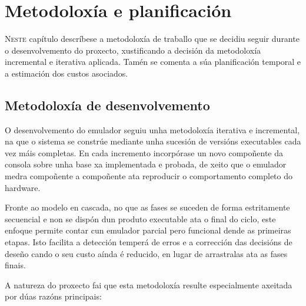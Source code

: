 \chapter{Metodoloxía e planificación}
\label{chap:metodoloxia}

\lettrine{N}{este} capítulo descríbese a metodoloxía de traballo que se decidiu seguir durante o desenvolvemento do proxecto,
xustificando a decisión da metodoloxía incremental e iterativa aplicada.
Tamén se comenta a súa planificación temporal e a estimación dos custos asociados.

\section{Metodoloxía de desenvolvemento}
O desenvolvemento do emulador seguiu unha metodoloxía iterativa e incremental,
na que o sistema se constrúe mediante unha sucesión de versións executables cada vez máis completas.
En cada incremento incorpórase un novo compoñente da consola sobre unha base xa implementada e probada,
de xeito que o emulador medra compoñente a compoñente ata reproducir o comportamento completo do hardware.

Fronte ao modelo en cascada, no que as fases se suceden de forma estritamente secuencial
e non se dispón dun produto executable ata o final do ciclo,
este enfoque permite contar cun emulador parcial pero funcional dende as primeiras etapas.
Isto facilita a detección temperá de erros e a corrección das decisións de deseño
cando o seu custo aínda é reducido, en lugar de arrastralas ata as fases finais.

A natureza do proxecto fai que esta metodoloxía resulte especialmente axeitada por dúas razóns principais:

